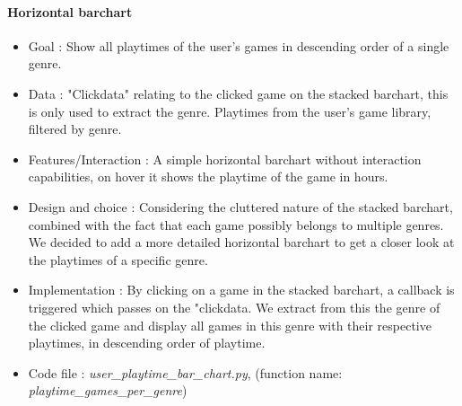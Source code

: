 \documentclass{article}
\begin{document}
        \paragraph{Horizontal barchart}
        \begin{itemize}
            \item Goal : Show all playtimes of the user's games in descending order of a single genre.
            \item Data : "Clickdata" relating to the clicked game on the stacked barchart, this is only used to extract the genre. Playtimes from the user's game library, filtered by genre.
            \item Features/Interaction : A simple horizontal barchart without interaction capabilities, on hover it shows the playtime of the game in hours.
            \item Design and choice : Considering the cluttered nature of the stacked barchart, combined with the fact that each game possibly belongs to multiple genres. We decided to add a more detailed horizontal barchart to get a closer look at the playtimes of a specific genre. 
            \item Implementation : By clicking on a game in the stacked barchart, a callback is triggered which passes on the "clickdata. We extract from this the genre of the clicked game and display all games in this genre with their respective playtimes, in descending order of playtime.
            \item Code file : \textit{user\_playtime\_bar\_chart.py}, (function name: \textit{playtime\_games\_per\_genre})
        \end{itemize}
        
\end{document}
